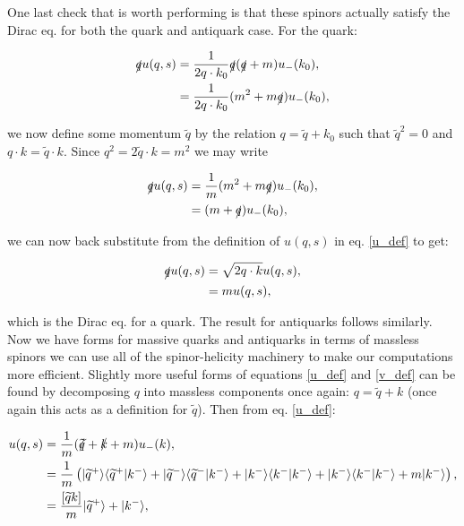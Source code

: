 		One last check that is worth performing is that these spinors actually satisfy the Dirac eq. for both the quark and antiquark case.  For the quark:

		\begin{subequations}
		\begin{align*}
			\slashed q u(q, s) &= \frac{1}{2q\cdot k_0}\slashed q(\slashed q + m)u_-(k_0), \\
			                   &= \frac{1}{2q\cdot k_0}(m^2 + m\slashed q)u_-(k_0), \\
		\end{align*}
		\end{subequations}

		we now define some momentum $\widetilde{q}$ by the relation $q = \widetilde{q} + k_0$ such that $\widetilde{q}^2=0$ and
		$q\cdot k = \widetilde{q}\cdot k$.  Since $q^2=2\widetilde{q}\cdot k=m^2$ we may write

		\begin{subequations}
		\begin{align*}
			\slashed q u(q, s) &= \frac{1}{m}(m^2 + m\slashed q)u_-(k_0), \\
			                   &= (m + \slashed q)u_-(k_0), \\
		\end{align*}
		\end{subequations}

		we can now back substitute from the definition of $u(q, s)$ in eq. \ref{u_def} to get:

		\begin{subequations}
		\begin{align*}
			\slashed q u(q, s) &= \sqrt{2q\cdot k}u(q, s), \\
			                   &= mu(q,s), \\
		\end{align*}
		\end{subequations}

		which is the Dirac eq. for a quark.  The result for antiquarks follows similarly.
		Now we have forms for massive quarks and antiquarks in terms of massless spinors we can
		use all of the spinor-helicity machinery to make our computations more efficient.  Slightly
		more useful forms of equations \ref{u_def} and \ref{v_def} can be found by decomposing $q$
		into massless components once again: $q=\widetilde{q}+k$ (once again this acts as a
		definition for $\widetilde{q}$).  Then from eq. \ref{u_def}:

		\begin{subequations}
		\begin{align*}
			u(q, s) &= \frac{1}{m}(\slashed{\widetilde{q}} + \slashed{k} + m)u_-(k), \\
			        &= \frac{1}{m}\left(|\widetilde{q}^+ \rangle\langle \widetilde{q}^+|k^-\rangle +
			        |\widetilde{q}^- \rangle\langle \widetilde{q}^-|k^-\rangle + |k^- \rangle\langle k^-|k^-\rangle +
			        |k^- \rangle\langle k^-|k^-\rangle + m|k^-\rangle\right), \\
			        &= \frac{[\widetilde{q}k]}{m}|\widetilde{q}^+\rangle + |k^-\rangle,
		\end{align*}
		\end{subequations}

